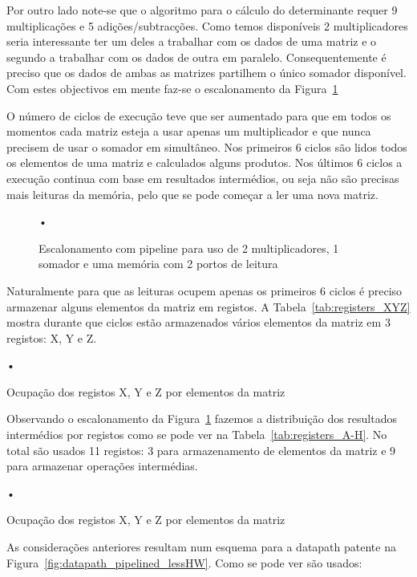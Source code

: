 \documentclass[a4paper]{article}
\begin{document}
Por outro lado note-se que o algoritmo para o cálculo do determinante requer 9 multiplicações e 5 adições/subtracções. Como temos disponíveis 2 multiplicadores seria interessante ter um deles a trabalhar com os dados de uma matriz e o segundo a trabalhar com os dados de outra em paralelo. Consequentemente é preciso que os dados de ambas as matrizes partilhem o único somador disponível. Com estes objectivos em mente faz-se o escalonamento da Figura~\ref{fig:scheduling_2portRAM_pipelined_lessHW}

O número de ciclos de execução teve que ser aumentado para que em todos os momentos cada matriz esteja a usar apenas um multiplicador e que nunca precisem de usar o somador em simultâneo. Nos primeiros 6 ciclos são lidos todos os elementos de uma matriz e calculados alguns produtos. Nos últimos 6 ciclos a execução continua com base em resultados intermédios, ou seja não são precisas mais leituras da memória, pelo que se pode começar a ler uma nova matriz.

\begin{figure}[h]
\centering
•
\caption{Escalonamento com pipeline para uso de 2 multiplicadores, 1 somador e uma memória com 2 portos de leitura}
\label{fig:scheduling_2portRAM_pipelined_lessHW}
\end{figure}

Naturalmente para que as leituras ocupem apenas os primeiros 6 ciclos é preciso armazenar alguns elementos da matriz em registos. A Tabela~\ref{tab:registers_XYZ} mostra durante que ciclos estão armazenados vários elementos da matriz em 3 registos: X, Y e Z.

\begin{table}
\centering
•
\caption{Ocupação dos registos X, Y e Z por elementos da matriz}
\label{tab:registers_XYZ}
\end{table}

Observando o escalonamento da Figura~\ref{fig:scheduling_2portRAM_pipelined_lessHW} fazemos a distribuição dos resultados intermédios por registos como se pode ver na Tabela~\ref{tab:registers_A-H}. No total são usados 11 registos: 3 para armazenamento de elementos da matriz e 9 para armazenar operações intermédias.

\begin{table}
\centering
•
\caption{Ocupação dos registos X, Y e Z por elementos da matriz}
\label{tab:registers_A-H}
\end{table}

As considerações anteriores resultam num esquema para a datapath patente na Figura~\ref{fig:datapath_pipelined_lessHW}. Como se pode ver são usados:
\end{document}
